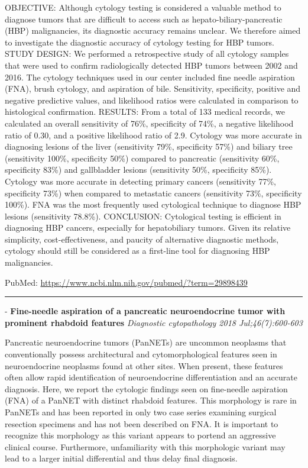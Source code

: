 \documentclass[]{article}
\begin{document}
OBJECTIVE: Although cytology testing is considered a valuable method to
diagnose tumors that are difficult to access such as
hepato-biliary-pancreatic (HBP) malignancies, its diagnostic accuracy
remains unclear. We therefore aimed to investigate the diagnostic
accuracy of cytology testing for HBP tumors. STUDY DESIGN: We performed
a retrospective study of all cytology samples that were used to confirm
radiologically detected HBP tumors between 2002 and 2016. The cytology
techniques used in our center included fine needle aspiration (FNA),
brush cytology, and aspiration of bile. Sensitivity, specificity,
positive and negative predictive values, and likelihood ratios were
calculated in comparison to histological confirmation. RESULTS: From a
total of 133 medical records, we calculated an overall sensitivity of
76\%, specificity of 74\%, a negative likelihood ratio of 0.30, and a
positive likelihood ratio of 2.9. Cytology was more accurate in
diagnosing lesions of the liver (sensitivity 79\%, specificity 57\%) and
biliary tree (sensitivity 100\%, specificity 50\%) compared to
pancreatic (sensitivity 60\%, specificity 83\%) and gallbladder lesions
(sensitivity 50\%, specificity 85\%). Cytology was more accurate in
detecting primary cancers (sensitivity 77\%, specificity 73\%) when
compared to metastatic cancers (sensitivity 73\%, specificity 100\%).
FNA was the most frequently used cytological technique to diagnose HBP
lesions (sensitivity 78.8\%). CONCLUSION: Cytological testing is
efficient in diagnosing HBP cancers, especially for hepatobiliary
tumors. Given its relative simplicity, cost-effectiveness, and paucity
of alternative diagnostic methods, cytology should still be considered
as a first-line tool for diagnosing HBP malignancies.

PubMed: \url{https://www.ncbi.nlm.nih.gov/pubmed/?term=29898439}

{}

{}

\begin{center}\rule{0.5\linewidth}{\linethickness}\end{center}

 - \textbf{Fine-needle aspiration of a pancreatic neuroendocrine tumor
with prominent rhabdoid features} \emph{Diagnostic cytopathology 2018
Jul;46(7):600-603}

Pancreatic neuroendocrine tumors (PanNETs) are uncommon neoplasms that
conventionally possess architectural and cytomorphological features seen
in neuroendocrine neoplasms found at other sites. When present, these
features often allow rapid identification of neuroendocrine
differentiation and an accurate diagnosis. Here, we report the cytologic
findings seen on fine-needle aspiration (FNA) of a PanNET with distinct
rhabdoid features. This morphology is rare in PanNETs and has been
reported in only two case series examining surgical resection specimens
and has not been described on FNA. It is important to recognize this
morphology as this variant appears to portend an aggressive clinical
course. Furthermore, unfamiliarity with this morphologic variant may
lead to a larger initial differential and thus delay final diagnosis.
\end{document}
